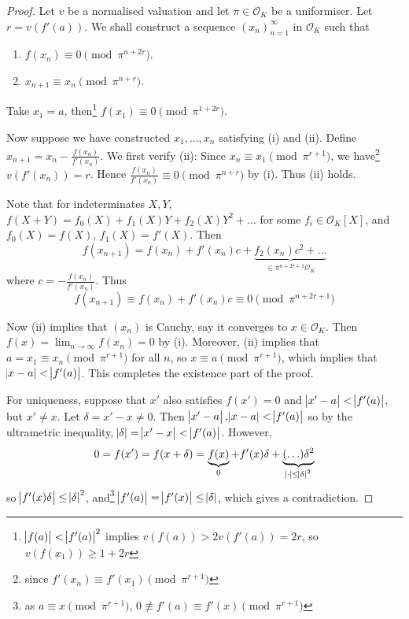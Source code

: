 \documentclass[11pt]{article}
\theoremstyle{definition}
\theoremstyle{plain}
\theoremstyle{remark}
\newcommand{\cO}{\mathcal{O}}
\begin{document}
\begin{proof}
    Let $v$ be a normalised valuation and let $\pi \in \cO_K$ be a uniformiser. Let $r = v(f'(a))$. We shall construct a sequence $(x_n)_{n=1}^\infty$ in $\cO_K$ such that
    \begin{enumerate}
        \item $f(x_n) \equiv 0 \pmod{\pi^{n + 2r}}$.
        \item $x_{n+1} \equiv x_n \pmod{\pi^{n+r}}$.
    \end{enumerate}
    Take $x_1 = a$, then\footnote{$\abs{f(a)} < \abs{f'(a)}^2$ implies $v(f(a)) > 2v(f'(a)) = 2r$, so $v(f(x_1)) \ge 1 + 2r$} $f(x_1) \equiv 0 \pmod{\pi^{1+2r}}$.

    Now suppose we have constructed $x_1, \ldots, x_n$ satisfying (i) and (ii). Define $x_{n+1} = x_n - \frac{f(x_n)}{f'(x_n)}$. We first verify (ii): Since $x_n \equiv x_1 \pmod{\pi^{r+1}}$, we have\footnote{since $f'(x_n) \equiv f'(x_1) \pmod{\pi^{r+1}}$} $v(f'(x_n)) = r$. Hence $\frac{f(x_n)}{f'(x_n)} \equiv 0 \pmod{\pi^{n+r}}$ by (i). Thus (ii) holds.

    Note that for indeterminates $X, Y$, $f(X + Y) = f_0(X) + f_1(X) Y + f_2(X) Y^2 + \ldots$ for some $f_i \in \cO_K[X]$, and $f_0(X) = f(X)$, $f_1(X) = f'(X)$. Then
    \begin{equation*}
        f(x_{n+1}) = f(x_n) + f'(x_n) c + \underbrace{f_2(x_n) c^2 + \ldots}_{\in \pi^{n + 2r + 1} \cO_K}
    \end{equation*}
    where $c = -\frac{f(x_n)}{f'(x_n)}$. Thus
    \begin{equation*}
        f(x_{n+1}) \equiv f(x_n) + f'(x_n) c \equiv 0 \pmod{\pi^{n + 2r + 1}}
    \end{equation*}

    Now (ii) implies that $(x_n)$ is Cauchy, say it converges to $x \in \cO_K$. Then $f(x) = \lim_{n \to \infty} f(x_n) = 0$ by (i). Moreover, (ii) implies that $a = x_1 \equiv x_n \pmod{\pi^{r+1}}$ for all $n$, so $x \equiv a \pmod{\pi^{r+1}}$, which implies that $\abs{x - a} < \abs{f'(a)}$. This completes the existence part of the proof.

    For uniqueness, suppose that $x'$ also satisfies $f(x') = 0$ and $\abs{x' - a} < \abs{f'(a)}$, but $x' \neq x$. Let $\delta = x' - x \neq 0$. Then $\abs{x' - a}, \abs{x - a} < \abs{f'(a)}$ so by the ultrametric inequality, $\abs{\delta} = \abs{x' - x} < \abs{f'(a)}$. However,
    \begin{equation*}
        0 = f(x') = f(x + \delta) = \underbrace{f(x)}_{0} + f'(x) \delta + \underbrace{(\ldots)\delta^2}_{\abs{\cdot} \le \abs{\delta}^2}
    \end{equation*}
    so $\abs{f'(x) \delta} \le \abs{\delta}^2$, and\footnote{as $a \equiv x \pmod{\pi^{r+1}}$, $0 \not\equiv f'(a) \equiv f'(x) \pmod{\pi^{r+1}}$} $\abs{f'(a)} = \abs{f'(x)} \le \abs{\delta}$, which gives a contradiction.
\end{proof}
\end{document}
